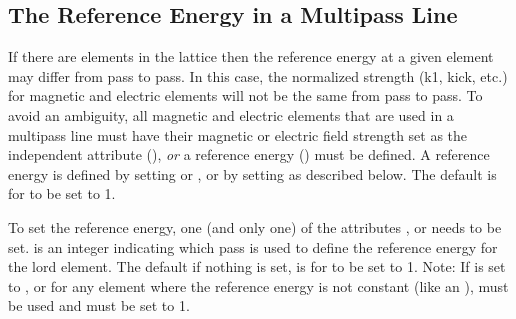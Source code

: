 \subsection{The Reference Energy in a Multipass Line}
\label{s:ref.e.multi}

If there are  elements in the lattice then the reference
energy at a given element may differ from pass to pass. In this case,
the normalized strength (k1, kick, etc.) for magnetic and electric
elements will not be the same from pass to pass. To avoid an
ambiguity, all magnetic and electric elements that are used in a
multipass line must have their magnetic or electric field strength set
as the independent attribute (), {\em or} a reference
energy () must be defined. A reference energy is
defined by setting  or , or by setting
 as described below. The default is for 
to be set to 1.

To set the reference energy, one (and only one) of the attributes
,  or  needs to be
set.  is an integer indicating which pass is used to
define the reference energy for the lord element. The default if
nothing is set, is for  to be set to 1.  Note: If
 is set to , or for any element
where the reference energy is not constant (like an ),
 must be used and must be set to 1.
